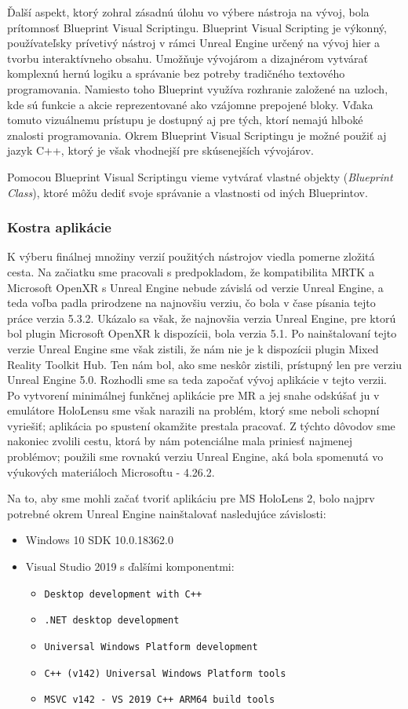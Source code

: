 Ďalší aspekt, ktorý zohral zásadnú úlohu vo výbere nástroja na vývoj, bola prítomnosť Blueprint Visual Scriptingu. Blueprint Visual Scripting je výkonný, používateľsky prívetivý nástroj v rámci 
Unreal Engine určený na vývoj hier a tvorbu interaktívneho obsahu. Umožňuje vývojárom a dizajnérom vytvárať komplexnú hernú logiku a správanie bez potreby tradičného textového programovania. Namiesto toho 
Blueprint využíva rozhranie založené na uzloch, kde sú funkcie a akcie reprezentované ako vzájomne prepojené bloky. Vďaka tomuto vizuálnemu prístupu je dostupný aj pre tých, ktorí nemajú hlboké znalosti programovania.
Okrem Blueprint Visual Scriptingu je možné použiť aj jazyk C++, ktorý je však vhodnejší pre skúsenejších vývojárov.

Pomocou Blueprint Visual Scriptingu vieme vytvárať vlastné objekty (\emph{Blueprint Class}), ktoré môžu dediť svoje správanie a vlastnosti od iných Blueprintov.

\subsubsection{Kostra aplikácie}
K výberu finálnej množiny verzií použitých nástrojov viedla pomerne zložitá cesta. Na začiatku sme pracovali s predpokladom, že kompatibilita MRTK a Microsoft OpenXR s Unreal Engine nebude závislá od verzie Unreal
Engine, a teda voľba padla prirodzene na najnovšiu verziu, čo bola v čase písania tejto práce verzia 5.3.2. Ukázalo sa však, že najnovšia verzia Unreal Engine, pre ktorú bol plugin Microsoft OpenXR k dispozícii, bola verzia 5.1.
Po nainštalovaní tejto verzie Unreal Engine sme však zistili, že nám nie je k dispozícii plugin Mixed Reality Toolkit Hub. Ten nám bol, ako sme neskôr zistili, prístupný len pre verziu Unreal Engine 5.0. Rozhodli sme sa teda
započať vývoj aplikácie v tejto verzii. Po vytvorení minimálnej funkčnej aplikácie pre MR a jej snahe odskúšať ju v emulátore HoloLensu sme však narazili na problém, ktorý sme neboli schopní vyriešiť; aplikácia po spustení
okamžite prestala pracovať. 
Z týchto dôvodov sme nakoniec zvolili cestu, ktorá by nám potenciálne mala priniesť najmenej problémov; použili sme rovnakú verziu Unreal Engine, aká bola spomenutá vo výukových materiáloch Microsoftu - 4.26.2.

Na to, aby sme mohli začať tvoriť aplikáciu pre MS HoloLens 2, bolo najprv potrebné okrem Unreal Engine nainštalovať nasledujúce závislosti:
\begin{itemize}
  \item Windows 10 SDK 10.0.18362.0
  \item Visual Studio 2019 s ďalšími komponentmi:
  \begin{itemize}    
    \item \texttt{Desktop development with C++}
    \item \texttt{.NET desktop development}
    \item \texttt{Universal Windows Platform development}
    \item \texttt{C++ (v142) Universal Windows Platform tools}
    \item \texttt{MSVC v142 - VS 2019 C++ ARM64 build tools}    
  \end{itemize}
\end{itemize}

